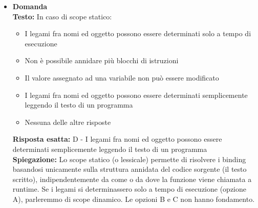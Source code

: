 \documentclass[12pt, a4paper]{article}
\newcounter{domandateoria}
\begin{document}
\begin{itemize}
    \item {}\textbf{Domanda \thedomandateoria} \\
    \textbf{Testo:} In caso di scope statico:
    \begin{itemize}
        \item[A)] I legami fra nomi ed oggetto possono essere determinati solo a tempo di esecuzione
        \item[B)] Non è possibile annidare più blocchi di istruzioni
        \item[C)] Il valore assegnato ad una variabile non può essere modificato
        \item[D)] I legami fra nomi ed oggetto possono essere determinati semplicemente leggendo il testo di un programma
        \item[E)] Nessuna delle altre risposte
    \end{itemize}
    \textbf{Risposta esatta:} D - I legami fra nomi ed oggetto possono essere determinati semplicemente leggendo il testo di un programma \\
    \textbf{Spiegazione:} Lo scope statico (o lessicale) permette di risolvere i binding basandosi unicamente sulla struttura annidata del codice sorgente (il testo scritto), indipendentemente da come o da dove la funzione viene chiamata a runtime. Se i legami si determinassero solo a tempo di esecuzione (opzione A), parleremmo di scope dinamico. Le opzioni B e C non hanno fondamento.
    \vspace{0.3cm}

\newpage


\end{itemize}
\end{document}
